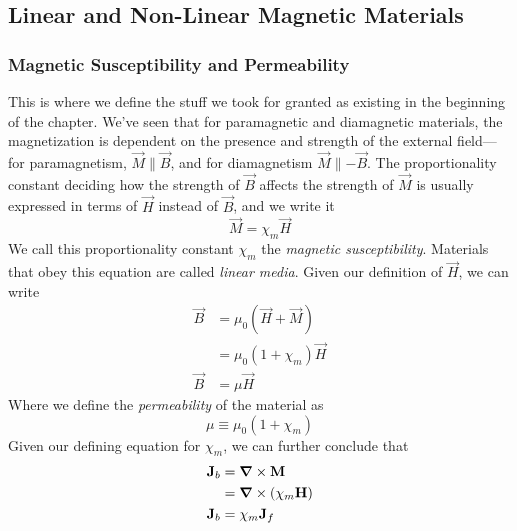 \documentclass[a4paper]{article}
\begin{document}
\subsection{Linear and Non-Linear Magnetic Materials}
\subsubsection{Magnetic Susceptibility and Permeability}

This is where we define the stuff we took for granted as existing in the
beginning of the chapter. We've seen that for paramagnetic and diamagnetic
materials, the magnetization is dependent on the presence and strength of the
external field---for paramagnetism, $\vec{M}\parallel\vec{B}$, and for
diamagnetism $\vec{M}\parallel-\vec{B}$. The proportionality constant
deciding how the strength of $\vec{B}$ affects the strength of $\vec{M}$
is usually expressed in terms of $\vec{H}$ instead of $\vec{B}$, and we write
it
\[ \vec{M} = \chi_m\vec{H} \]
We call this proportionality constant $\chi_m$ the
\emph{magnetic susceptibility}. Materials that obey this equation are called
\emph{linear media}. Given our definition of $\vec{H}$, we can write
\begin{align*}
	\vec{B} &= \mu_0(\vec{H}+\vec{M})\\
		&= \mu_0(1+\chi_m)\vec{H}\\
	\vec{B} &= \mu\vec{H}
\end{align*}
Where we define the \emph{permeability} of the material as
\[ \mu \equiv \mu_0(1+\chi_m) \]
Given our defining equation for $\chi_m$, we can further conclude that
\begin{align*}
	\boldsymbol{\mathbf{J}}_b &= \boldsymbol{\mathbf{\nabla}}\times\boldsymbol{\mathbf{M}}\\
		  &=\boldsymbol{\mathbf{\nabla}}\times(\chi_m\boldsymbol{\mathbf{H}})\\
	\boldsymbol{\mathbf{J}}_b &= \chi_m\boldsymbol{\mathbf{J}}_f
\end{align*}
\end{document}
